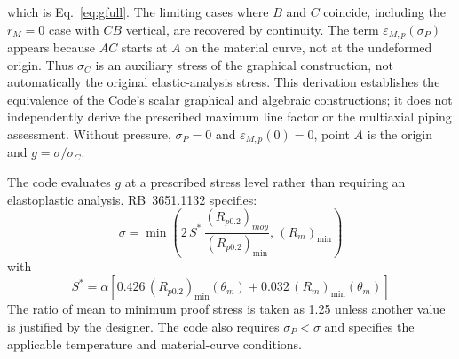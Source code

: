 \documentclass[10pt,a4paper]{article}
\begin{document}
which is Eq.~\eqref{eq:gfull}. The limiting cases where $B$ and $C$ coincide, including the $r_M=0$ case with $CB$ vertical, are recovered by continuity. The term $\varepsilon_{M,p}(\sigma_P)$ appears because $AC$ starts at $A$ on the material curve, not at the undeformed origin. Thus $\sigma_C$ is an auxiliary stress of the graphical construction, not automatically the original elastic-analysis stress. This derivation establishes the equivalence of the Code's scalar graphical and algebraic constructions; it does not independently derive the prescribed maximum line factor or the multiaxial piping assessment. Without pressure, $\sigma_P=0$ and $\varepsilon_{M,p}(0)=0$, point $A$ is the origin and $g=\sigma/\sigma_C$.

The code evaluates \(g\) at a prescribed stress level rather than requiring an elastoplastic analysis. RB~3651.1132 specifies:
\begin{equation*} 
\sigma = \min\left(2\,S^{*}\,\frac{(R_{p0.2})_{moy}}{(R_{p0.2})_{\min}},\, (R_m)_{\min}\right)
\end{equation*}
with
\begin{equation*} 
S^{*} = \alpha \left[ 0.426\,(R_{p0.2})_{\min}(\theta_m) + 0.032\,(R_m)_{\min}(\theta_m) \right]
\end{equation*}
The ratio of mean to minimum proof stress is taken as 1.25 unless another value is justified by the designer. The code also requires $\sigma_P<\sigma$ and specifies the applicable temperature and material-curve conditions.
\end{document}
